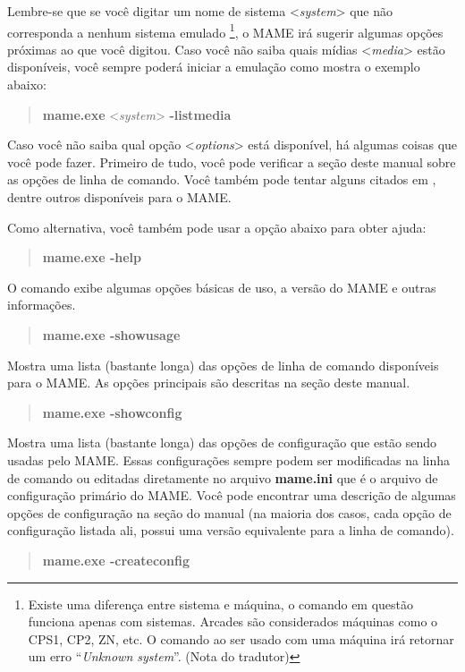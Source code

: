 \documentclass[letterpaper,10pt,brazil]{sphinxmanual}
\begin{document}
Lembre-se que se você digitar um nome de sistema \textless{}\emph{system}\textgreater{} que não
corresponda a nenhum sistema emulado \footnote[1]{\sphinxAtStartFootnote%
Existe uma diferença entre sistema e máquina, o comando em
questão funciona apenas com sistemas. Arcades são considerados
máquinas como o CPS1, CP2, ZN, etc. O comando ao ser usado com
uma máquina irá retornar um erro ``\emph{Unknown system}''.
(Nota do tradutor)
}, o MAME irá sugerir algumas opções
próximas ao que você digitou. Caso você não saiba quais mídias \textless{}\emph{media}\textgreater{}
estão disponíveis, você sempre poderá iniciar a emulação como mostra
o exemplo abaixo:
\begin{quote}

\textbf{mame.exe} \textless{}\emph{system}\textgreater{} \textbf{-listmedia}
\end{quote}

Caso você não saiba qual opção \textless{}\emph{options}\textgreater{} está disponível, há algumas
coisas que você pode fazer. Primeiro de tudo, você pode verificar a
seção deste manual sobre as opções de linha de comando. Você também pode
tentar alguns citados em {\hyperref[usingmame/frontends:frontends]{}}, dentre outros disponíveis
para o MAME.

Como alternativa, você também pode usar a opção abaixo para obter ajuda:
\begin{quote}

\textbf{mame.exe -help}
\end{quote}

O comando exibe algumas opções básicas de uso, a versão do MAME e outras
informações.
\begin{quote}

\textbf{mame.exe -showusage}
\end{quote}

Mostra uma lista (bastante longa) das opções de linha de comando
disponíveis para o MAME. As opções principais são descritas na seção
{\hyperref[commandline/commandline\string-index:index\string-commandline]{}} deste manual.
\begin{quote}

\textbf{mame.exe -showconfig}
\end{quote}

Mostra uma lista (bastante longa) das opções de configuração que estão
sendo usadas pelo MAME. Essas configurações sempre podem ser modificadas
na linha de comando ou editadas diretamente no arquivo \textbf{mame.ini} que
é o arquivo de configuração primário do MAME. Você pode encontrar uma
descrição de algumas opções de configuração na seção
{\hyperref[commandline/commandline\string-index:index\string-commandline]{}} do manual (na maioria dos casos, cada opção de
configuração listada ali, possui uma versão equivalente para a linha de
comando).
\begin{quote}

\textbf{mame.exe -createconfig}
\end{quote}
\end{document}
